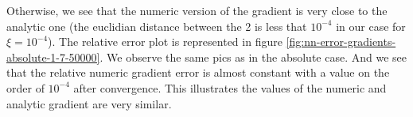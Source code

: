 \documentclass{article}
\begin{document}
Otherwise, we see that the numeric version of the gradient is very
close to the analytic one (the euclidian distance between the 2 is
less that $10^{-4}$ in our case for $\xi = 10^{-4}$). The relative
error plot is represented in figure
\ref{fig:nn-error-gradients-absolute-1-7-50000}. We observe the same
pics as in the absolute case. And we see that the relative numeric
gradient error is almost constant with a value on the order of
$10^{-4}$ after convergence. This illustrates the values of the
numeric and analytic gradient are very similar.










\end{document}

